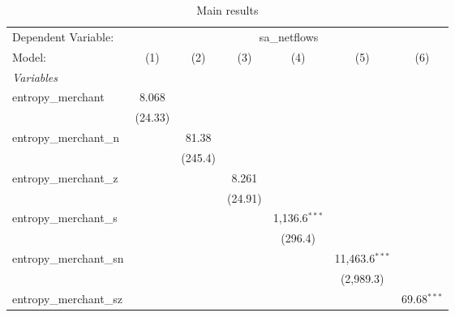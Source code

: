 
\begin{table}[htbp]
   \centering
   \footnotesize
   \begin{threeparttable}[b]
      \caption{\label{tab:reg_sa_netflows_merchant.tex} Main results}
      \begin{tabular}{lcccccc}
         \tabularnewline \midrule \midrule
         Dependent Variable: & \multicolumn{6}{c}{sa\_netflows}\\
         Model:                  & (1)            & (2)            & (3)            & (4)             & (5)              & (6)\\  
         \midrule
         \emph{Variables}\\
         entropy\_merchant       & 8.068          &                &                &                 &                  &   \\   
                                 & (24.33)        &                &                &                 &                  &   \\   
         entropy\_merchant\_n    &                & 81.38          &                &                 &                  &   \\   
                                 &                & (245.4)        &                &                 &                  &   \\   
         entropy\_merchant\_z    &                &                & 8.261          &                 &                  &   \\   
                                 &                &                & (24.91)        &                 &                  &   \\   
         entropy\_merchant\_s    &                &                &                & 1,136.6$^{***}$ &                  &   \\   
                                 &                &                &                & (296.4)         &                  &   \\   
         entropy\_merchant\_sn   &                &                &                &                 & 11,463.6$^{***}$ &   \\   
                                 &                &                &                &                 & (2,989.3)        &   \\   
         entropy\_merchant\_sz   &                &                &                &                 &                  & 69.68$^{***}$\\   

\end{tabular}
\end{threeparttable}
\end{table}
